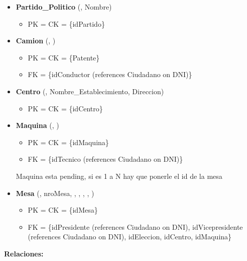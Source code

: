 \begin{itemize}
	\item \textbf{Partido\_Politico} (, Nombre) 
	\begin{itemize}
		\item PK = CK = \{idPartido\}
	\end{itemize}
	\vspace{1mm}

	\item \textbf{Camion} (, ) 
	\begin{itemize}
		\item PK = CK = \{Patente\}
		\item FK = \{idConductor (references Ciudadano on DNI)\}
	\end{itemize}
	\vspace{1mm}

	\item \textbf{Centro} (, Nombre\_Establecimiento, Direccion) 
	\begin{itemize}
		\item PK = CK = \{idCentro\}
	\end{itemize}
	\vspace{1mm}

	\item \textbf{Maquina} (, ) 
	\begin{itemize}
		\item PK = CK = \{idMaquina\}
		\item FK = \{idTecnico (references Ciudadano on DNI)\}
	\end{itemize}
	\vspace{1mm}
Maquina esta pending, si es 1 a N hay que ponerle el id de la mesa
	\item \textbf{Mesa} (, nroMesa, , , , , ) 
	\begin{itemize}
		\item PK = CK = \{idMesa\}
		\item FK = \{idPresidente (references Ciudadano on DNI), idVicepresidente (references Ciudadano on DNI), idEleccion, idCentro, idMaquina\}
	\end{itemize}
	\vspace{1mm}

\end{itemize}
		
\vspace{2mm}
\textbf{Relaciones:}
\vspace{1mm}

